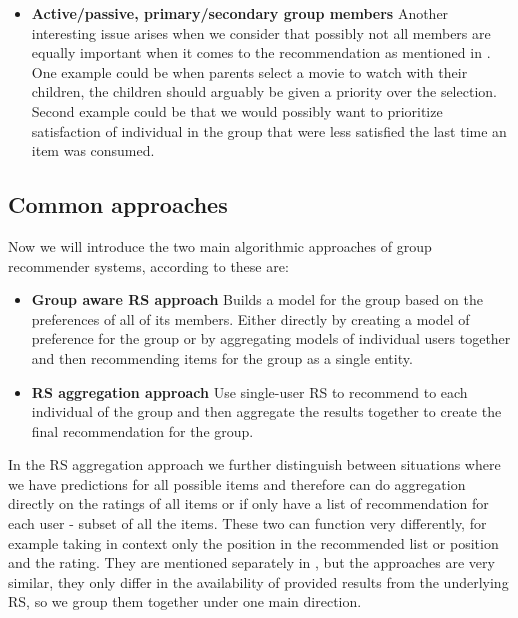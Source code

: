 \begin{itemize}
    \item \textbf{Active/passive, primary/secondary group members} \newline
        Another interesting issue arises when we consider that possibly not all members are equally important when it comes to the recommendation as mentioned in \cite{deCampos_2009_managing_uncertanity_in_grouprec}. One example could be when parents select a movie to watch with their children, the children should arguably be given a priority over the selection. Second example could be that we would possibly want to prioritize satisfaction of individual in the group that were less satisfied the last time an item was consumed.
\end{itemize}


\subsection{Common approaches}\label{subsec:01_group_rec_sys.common_aproaches}
Now we will introduce the two main algorithmic approaches of group recommender systems, according to \cite{recommendations_to_groups-jameson2007} these are:
\begin{itemize}
    \item \textbf{Group aware RS approach}\newline
    Builds a model for the group based on the preferences of all of its members. Either directly by creating a model of preference for the group or by aggregating models of individual users together and then recommending items for the group as a single entity.
    \item \textbf{RS aggregation approach}\newline
    Use single-user RS to recommend to each individual of the group and then aggregate the results together to create the final recommendation for the group.
    
\end{itemize}

In the RS aggregation approach we further distinguish between situations where we have predictions for all possible items and therefore can do aggregation directly on the ratings of all items or if only have a list of recommendation for each user - subset of all the items. These two can function very differently, for example taking in context only the position in the recommended list or position and the rating. They are mentioned separately in \cite{recommendations_to_groups-jameson2007}, but the approaches are very similar, they only differ in the availability of provided results from the underlying RS, so we group them together under one main direction.

